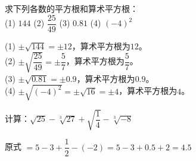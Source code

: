 \documentclass[a4paper,12pt]{ctexart}
\begin{document}

\begin{example}
求下列各数的平方根和算术平方根：\\
(1) $144$ \qquad (2) $\dfrac{25}{49}$ \qquad (3) $0.81$ \qquad (4) $(-4)^2$
\end{example}
\begin{solution}
(1) $\pm\sqrt{144}=\pm12$，算术平方根为$12$。\\
(2) $\pm\sqrt{\dfrac{25}{49}}=\pm\dfrac{5}{7}$，算术平方根为$\dfrac{5}{7}$。\\
(3) $\pm\sqrt{0.81}=\pm0.9$，算术平方根为$0.9$。\\
(4) $\pm\sqrt{(-4)^2}=\pm\sqrt{16}=\pm4$，算术平方根为$4$。
\end{solution}

\begin{example}
计算：$\sqrt{25}-\sqrt[3]{27}+\sqrt{\dfrac{1}{4}}-\sqrt[3]{-8}$
\end{example}
\begin{solution}
原式 $=5-3+\dfrac{1}{2}-(-2)=5-3+0.5+2=4.5$
\end{solution}

\end{document}
